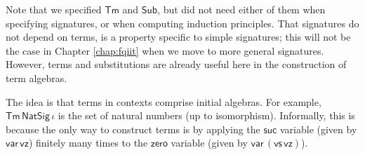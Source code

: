 \documentclass[12pt,a4paper,twoside,openany]{book}
\theoremstyle{remark}
\theoremstyle{definition}
\theoremstyle{theorem}
\newcommand{\ms}[1]{\mathsf{#1}}
\newcommand{\Sub}{\mathsf{Sub}}
\newcommand{\Tm}{\mathsf{Tm}}
\newcommand{\var}{\ms{var}}
\newcommand{\vz}{\ms{vz}}
\newcommand{\vs}{\ms{vs}}
\begin{document}
Note that we specified $\Tm$ and $\Sub$, but did not need either of them when
specifying signatures, or when computing induction principles. That signatures
do not depend on terms, is a property specific to simple signatures; this will
not be the case in Chapter \ref{chap:fqiit} when we move to more general
signatures. However, terms and substitutions are already useful here in the
construction of term algebras.

The idea is that terms in contexts comprise initial algebras. For example,
$\Tm\,\ms{NatSig}\,\iota$ is the set of natural numbers (up to
isomorphism). Informally, this is because the only way to construct terms is by
applying the $\ms{suc}$ variable (given by $\var\,\vz$) finitely many times to
the $\ms{zero}$ variable (given by $\var\,(\vs\,\vz)$).

\begingroup
\allowdisplaybreaks
\end{document}
